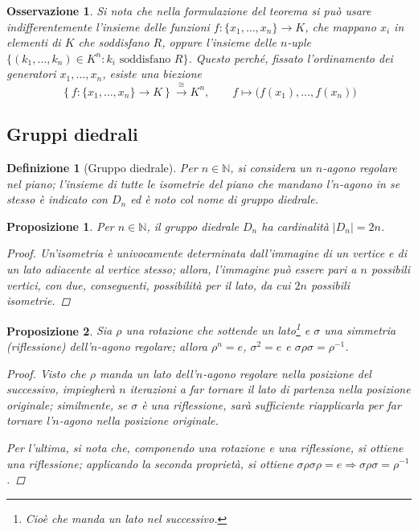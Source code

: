 \documentclass[11pt]{scrartcl}
\theoremstyle{style1}
\newtheorem{osservazione}{Osservazione}[section]
\newtheorem{prop}{Proposizione}[section]
\newtheorem{definizione}{Definizione}[section]
\numberwithin{equation}{subsection}
\begin{document}
\begin{osservazione}
Si nota che nella formulazione del teorema si può usare indifferentemente l'insieme delle funzioni \(f:\{x_1,\dots,x_n\}\longrightarrow K\), che mappano \(x_i\) in elementi di \(K\) che soddisfano \(R\), oppure l'insieme delle \(n\)-uple \(\{(k_1,\dots,k_n)\in K^n:k_i \text{ soddisfano } R\}\).
Questo perché, fissato l'ordinamento dei generatori \(x_1,\dots,x_n\), esiste una biezione 
\[
\left\{ f:\{x_1,\dots,x_n\}\longrightarrow  K\right\}\xrightarrow{\ \cong\ }K^n,\qquad f\longmapsto\big(f(x_1),\dots,f(x_n)\big)
\]
\end{osservazione}

\subsection{Gruppi diedrali}
\begin{definizione}
	[Gruppo diedrale]
	Per $n \in \mathbb{N}$, si considera un $n$-agono regolare nel piano; l'insieme di tutte le isometrie del piano che mandano l'$n$-agono in se stesso \`e indicato con $D_n$ ed \`e noto col nome di \textit{gruppo diedrale}.
\end{definizione}
\begin{prop}
	Per $n \in \mathbb{N}$, il gruppo diedrale $D_n$ ha cardinalit\`a $\lvert D_n \rvert = 2n$.
	\begin{proof}
		Un'isometria \`e univocamente determinata dall'immagine di un vertice e di un lato adiacente al vertice stesso; allora, l'immagine pu\`o essere pari a $n$ possibili vertici, con due, conseguenti, possibilit\`a per il lato, da cui $2n$ possibili isometrie.
	\end{proof}
\end{prop}
\begin{prop}
	Sia $\rho $ una rotazione che sottende un lato\footnote{Cioè che manda un lato nel successivo.} e $\sigma $ una simmetria (riflessione) dell'$n$-agono regolare; allora $\rho ^n = e$, $\sigma ^2 =e$ e $\sigma \rho \sigma = \rho ^{-1} $.
	\begin{proof}
		Visto che $\rho $ manda un lato dell'$n$-agono regolare nella posizione del successivo, impiegher\`a $n$ iterazioni a far tornare il lato di partenza nella posizione originale; similmente, se $\sigma $ \`e una riflessione, sar\`a sufficiente riapplicarla per far tornare l'$n$-agono nella posizione originale.

		Per l'ultima, si nota che, componendo una rotazione e una riflessione, si ottiene una riflessione; applicando la seconda propriet\`a, si ottiene $\sigma \rho \sigma \rho = e \Rightarrow \sigma \rho \sigma  = \rho ^{-1} $.
	\end{proof}
\end{prop}
\end{document}
